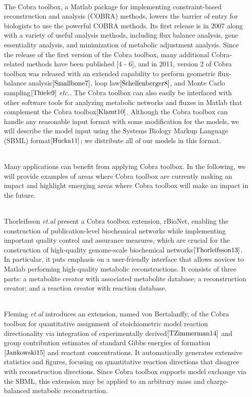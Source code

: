 \documentclass[11pt, a4paper]{article}
\begin{document}
	~\\The Cobra toolbox, a Matlab package for implementing constraint-based reconstruction and analysis (COBRA) methods, lowers the barrier of entry for biologists to use the powerful COBRA methods. Its first release is in 2007 along with a variety of useful analysis methods, including flux balance analysis, gene essentiality analysis, and minimization of metabolic adjustment analysis. Since the release of the first version of the Cobra toolbox, many additional Cobra-related methods have been published [4 - 6], and in 2011, version 2 of Cobra toolbox was released with an extended capability to perform geometric flux-balance analysis$\cite{Smallbone7}$, loop law$\cite{Schellenberger8}$, and Monte Carlo sampling$\cite{Thiele9}$ \textit{etc.}. The Cobra toolbox can also easily be interfaced with other software tools for analyzing metabolic networks and fluxes in Matlab that complement the Cobra toolbox$\cite{Klamt10}$. Although the Cobra toolbox can handle any reasonable input format with some modification for the models, we will describe the model input using the Systems Biology Markup Language (SBML) format$\cite{Hucka11}$; we distribute all of our models in this format.

	~\\Many applications can benefit from applying Cobra toolbox. In the following, we will provide examples of areas where Cobra toolbox are currently making an impact and highlight emerging areas where Cobra toolbox will make an impact in the future.

	~\\Thorleifsson \textit{et.al} present a Cobra toolbox extension, rBioNet, enabling the construction of publication-level biochemical networks while implementing important quality control and assurance measures, which are crucial for the construction of high-quality genome-scale biochemical networks$\cite{Thorleifsson13}$. In particular, it puts emphasis on a user-friendly interface that allows novices to Matlab performing high-quality metabolic reconstructions. It consists of three parts: a metabolite creator with associated metabolite database; a reconstruction creator; and a reaction creator with reaction database.

	~\\Fleming \textit{et.al} introduces an extension, named von Bertalanffy, of the Cobra toolbox for quantitative assignment of stoichiometric model reaction directionality via integration of experimentally derived$\cite{TZimmerman14}$ and group contribution estimates of standard Gibbs energies of formation$\cite{Jankowski15}$ and reactant concentrations. It automatically generates extensive statistics and figures, focusing on quantitative reaction directions that disagree with reconstruction directions. Since Cobra toolbox supports model exchange via the SBML, this extension may be applied to an arbitrary mass and charge-balanced metabolic reconstruction.
\end{document}
